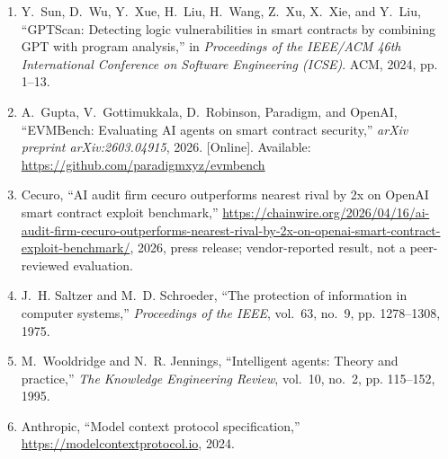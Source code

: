 \documentclass[conference]{IEEEtran}
\begin{document}
\begin{enumerate}
\item Y.~Sun, D.~Wu, Y.~Xue, H.~Liu, H.~Wang, Z.~Xu, X.~Xie, and Y.~Liu, ``{GPTScan}: Detecting logic vulnerabilities in smart contracts by combining {GPT} with program analysis,'' in \emph{Proceedings of the IEEE/ACM 46th International Conference on Software Engineering (ICSE)}. ACM, 2024, pp. 1--13.
\item A.~Gupta, V.~Gottimukkala, D.~Robinson, Paradigm, and OpenAI, ``{EVMBench}: Evaluating {AI} agents on smart contract security,'' \emph{arXiv preprint arXiv:2603.04915}, 2026. [Online]. Available: \url{https://github.com/paradigmxyz/evmbench}
\item {Cecuro}, ``{AI} audit firm cecuro outperforms nearest rival by 2x on {OpenAI} smart contract exploit benchmark,'' \url{https://chainwire.org/2026/04/16/ai-audit-firm-cecuro-outperforms-nearest-rival-by-2x-on-openai-smart-contract-exploit-benchmark/}, 2026, press release; vendor-reported result, not a peer-reviewed evaluation.
\item J.~H. Saltzer and M.~D. Schroeder, ``The protection of information in computer systems,'' \emph{Proceedings of the IEEE}, vol.~63, no.~9, pp. 1278--1308, 1975.
\item M.~Wooldridge and N.~R. Jennings, ``Intelligent agents: Theory and practice,'' \emph{The Knowledge Engineering Review}, vol.~10, no.~2, pp. 115--152, 1995.
\item {Anthropic}, ``Model context protocol specification,'' \url{https://modelcontextprotocol.io}, 2024.
\end{enumerate}
\end{document}
